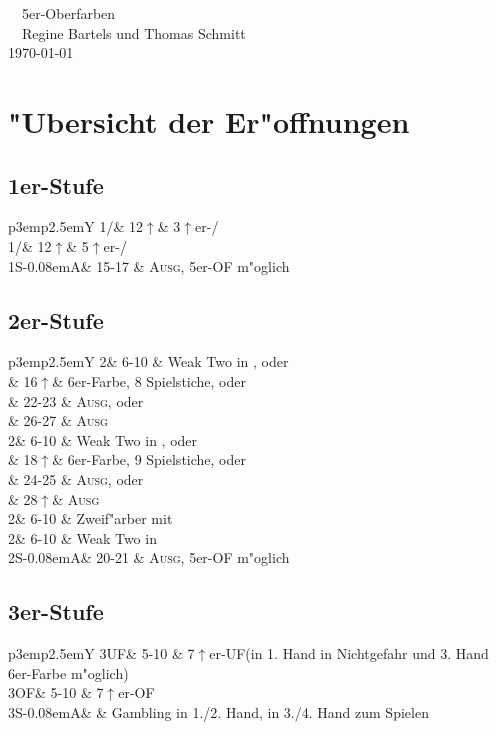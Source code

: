 \documentclass[11pt,german,twocolumn,twoside]{scrartcl}
\def\pi{\Sp\xspace}
\def\co{\He\xspace}
\def\ka{\Di\xspace}
\def\tr{\Cl\xspace}
\def\sa{\nobreak\textsf{S\kern-0.08emA}\xspace}
\def\ofa{\nobreak\textsf{OF}\xspace}
\def\ufa{\nobreak\textsf{UF}\xspace}
\def\pik{\nobreak\hspace{\cardskip}\Sp\xspace}
\def\coe{\nobreak\hspace{\cardskip}\He\xspace}
\def\kar{\nobreak\hspace{\cardskip}\Di\xspace}
\def\tre{\nobreak\hspace{\cardskip}\Cl\xspace}
\def\SA{\nobreak\hspace{\cardskip}\sa}
\def\of{\nobreak\hspace{\cardskip}\textsf{OF}\xspace}
\def\uf{\nobreak\hspace{\cardskip}\textsf{UF}\xspace}
\def\mi{\hspace{\cardskip}\Cl{}/\Di\xspace}
\def\ma{\hspace{\cardskip}\He{}/\Sp\xspace}
\def\pl{$\uparrow$\xspace}
\def\bal{\textsc{Ausg}\xspace}
\newcommand\bidinsfixed[1]{%
\begin{tabularx}{\columnwidth}{p{3em}p{2.5em}Y}%
#1
\end{tabularx}%
}
\begin{document}
\begin{center}
\textsf{{\co{}~~5er-Oberfarben~~\pi\\[1ex]}
\tr{}~~Regine Bartels und Thomas Schmitt~~\ka\\[1ex]
\small \today}
\end{center}
\tableofcontents

%
%
\newpage
\section{"Ubersicht der Er"offnungen}

\subsection*{1er-Stufe}
\bidinsfixed{%
1\mi & 12\pl	& 3\pl{}er-\mi\\[1ex]
1\ma & 12\pl	& 5\pl{}er-\ma\\[1ex]
1\SA & 15-17	& \bal, 5er-\ofa m"oglich
}

\subsection*{2er-Stufe}
\bidinsfixed{%
2\tre	& 6-10	& Weak Two in \ka, oder\\
	& 16\pl	& 6er-Farbe, 8 Spielstiche, oder\\
	& 22-23	& \bal, oder\\
	& 26-27	& \bal\\[1ex]
2\kar	& 6-10	& Weak Two in \co, oder\\
	& 18\pl	& 6er-Farbe, 9 Spielstiche, oder\\
	& 24-25	& \bal, oder\\
	& 28\pl	& \bal\\[1ex]
2\coe	& 6-10	& Zweif"arber mit \co\\[1ex]
2\pik	& 6-10	& Weak Two in \pi\\[1ex]
2\SA	& 20-21	& \bal, 5er-\ofa m"oglich
}

\subsection*{3er-Stufe}
\bidinsfixed{%
3\uf	& 5-10	& 7\pl{}er-\ufa (in 1. Hand in Nichtgefahr und 3. Hand 6er-Farbe m"oglich)\\[1ex]
3\of	& 5-10	& 7\pl{}er-\ofa\\[1ex]
3\SA	& 	& Gambling in 1./2. Hand, in 3./4. Hand zum Spielen
}
\end{document}
